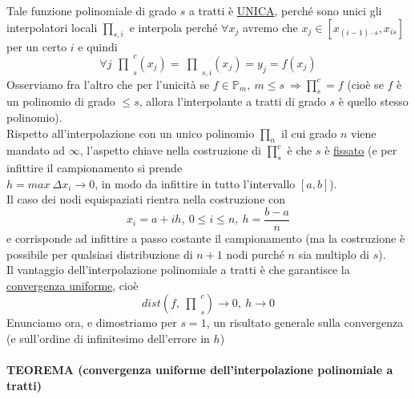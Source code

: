 \documentclass[12pt,a4paper]{article}
\newcommand{\inter}{\begin{matrix}\prod\end{matrix}}
\begin{document}
Tale funzione polinomiale di grado $s$ a tratti è \underline{UNICA}, perché sono unici gli interpolatori locali $\prod_{s,i}$ e interpola perché $\forall x_j$ avremo che $x_j \in [x_{(i-1) \cdot s}, x_{is}]$ per un certo $i$ e quindi
\[
\forall j\, \inter_s^c (x_j) = \inter_{s,i} (x_j) = y_j = f(x_j)
\]
Osserviamo fra l'altro che per l'unicità se $f \in \mathbb{P}_m, \ m \leq s \ \Rightarrow \prod_s^c = f$ (cioè se $f$ è un polinomio di grado $\leq s$, allora l'interpolante a tratti di grado $s$ è quello stesso polinomio).\\
Rispetto all'interpolazione con un unico polinomio $\prod_n$ il cui grado $n$ viene mandato ad $\infty$, l'aspetto chiave nella costruzione di $\prod_s^c$ è che $s$ è \underline{fissato} (e per infittire il campionamento si prende\\
$h=max \ \Delta x_i \to 0$, in modo da infittire in tutto l'intervallo $[a,b]$).\\
Il caso dei nodi equispaziati rientra nella costruzione con
\[
x_i = a+ih, \ 0 \leq i \leq n, \ h = \frac{b-a}{n}
\]
e corrisponde ad infittire a passo costante il campionamento (ma la costruzione è possibile per qualsiasi distribuzione di $n+1$ nodi purché $n$ sia multiplo di $s$).\\
Il vantaggio dell'interpolazione polinomiale a tratti è che garantisce la \underline{convergenza uniforme}, cioè 
\[
dist(f, \inter_{s}^{c}) \to 0, \ h \to 0
\]
Enunciamo ora, e dimostriamo per $s=1$, un risultato generale sulla convergenza (e sull'ordine
di infinitesimo dell'errore in $h$)\\\\
\textbf{TEOREMA (convergenza uniforme dell'interpolazione polinomiale a tratti)}\\
\begin{center}
\end{center}
\end{document}
